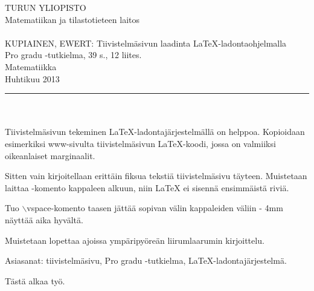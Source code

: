 \documentclass[a4paper,12pt,twoside]{article} %
\begin{document}
\begin{minipage}{15cm}

\noindent
TURUN YLIOPISTO\\
Matematiikan ja tilastotieteen laitos\\
\\
KUPIAINEN, EWERT: Tiivistelmäsivun laadinta LaTeX-ladontaohjelmalla\\
Pro gradu -tutkielma, 39 s., 12 liites.\\
Matematiikka\\
Huhtikuu 2013\\
\rule{\textwidth}{.2mm}\\
\\
Tiivistelmäsivun tekeminen LaTeX-ladontajärjestelmällä on helppoa. Kopioidaan esimerkiksi www-sivulta tiivistelmäsivun LaTeX-koodi, jossa on valmiiksi oikeanlaiset marginaalit.

\vspace{4mm}\noindent Sitten vain kirjoitellaan erittäin fiksua tekstiä tiivistelmäsivu täyteen. Muistetaan laittaa \noindent-komento kappaleen
alkuun, niin LaTeX ei sisennä ensimmäistä riviä.

\vspace{4mm}\noindent Tuo $\backslash$vspace-komento taasen jättää sopivan välin kappaleiden väliin - 4mm näyttää aika hyvältä.

\vspace{4mm}\noindent Muistetaan lopettaa ajoissa ympäripyöreän liirumlaarumin kirjoittelu.

\vspace{4mm}\noindent Asiasanat: tiivistelmäsivu, Pro gradu -tutkielma, LaTeX-ladontajärjestelmä.

\end{minipage}

\cleardoublepage

\pagestyle{plain} 
\setcounter{page}{1}

\addtolength{\oddsidemargin}{1.1cm}
\addtolength{\voffset}{2.3cm}

Tästä alkaa työ.
\end{document}
